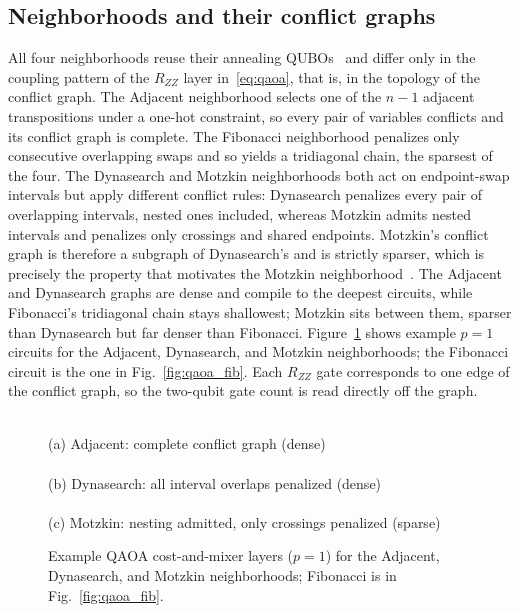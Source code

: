 \documentclass{svproc}
\newcommand{\rev}[1]{{\color{blue}#1}}
\newcommand{\rev}[1]{#1}
\begin{document}
\subsection{Neighborhoods and their conflict graphs}
\label{subsec:neigh}
All four neighborhoods reuse their annealing
QUBOs~\rev{\cite{wojewodzki2026windowed,wojewodzki2026soco}} and differ only in
the coupling pattern of the $R_{ZZ}$ layer in~\eqref{eq:qaoa}, that is,
in the topology of the conflict graph. The Adjacent neighborhood selects
one of the $n-1$ adjacent transpositions under a one-hot constraint, so
every pair of variables conflicts and its conflict graph is complete. The
Fibonacci neighborhood penalizes only consecutive overlapping swaps and
so yields a tridiagonal chain, the sparsest of the four. The Dynasearch
and Motzkin neighborhoods both act on endpoint-swap intervals but apply
different conflict rules: Dynasearch penalizes every pair of overlapping
intervals, nested ones included, whereas Motzkin admits nested intervals
and penalizes only crossings and shared endpoints. Motzkin's conflict
graph is therefore a subgraph of Dynasearch's and is strictly sparser,
which is precisely the property that motivates the Motzkin
neighborhood~\cite{wojewodzki2026soco}. The Adjacent and Dynasearch
graphs are dense and compile to the deepest circuits, while Fibonacci's
tridiagonal chain stays shallowest; Motzkin sits between them, sparser than
Dynasearch but far denser than Fibonacci.
Figure~\ref{fig:neigh_circuits} shows example $p=1$ circuits for the
Adjacent, Dynasearch, and Motzkin neighborhoods; the Fibonacci circuit is
the one in Fig.~\ref{fig:qaoa_fib}. Each $R_{ZZ}$ gate corresponds to one
edge of the conflict graph, so the two-qubit gate count is read directly
off the graph.

\begin{figure}[tb]
\centering
\\[0.4ex]
{\footnotesize (a) Adjacent: complete conflict graph (dense)}\\[2.2ex]
\\[0.4ex]
{\footnotesize (b) Dynasearch: all interval overlaps penalized (dense)}\\[2.2ex]
\\[0.4ex]
{\footnotesize (c) Motzkin: nesting admitted, only crossings penalized (sparse)}
\caption{Example QAOA cost-and-mixer layers ($p=1$) for the Adjacent,
  Dynasearch, and Motzkin neighborhoods; Fibonacci is in
  Fig.~\ref{fig:qaoa_fib}.}
\label{fig:neigh_circuits}
\end{figure}
\end{document}
